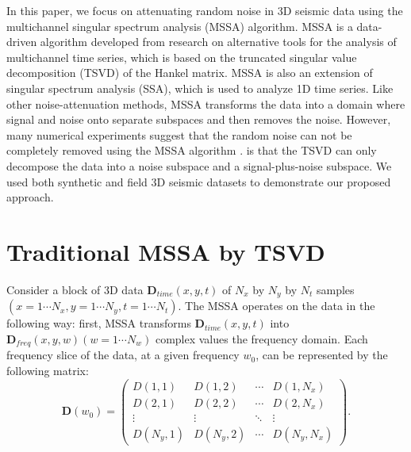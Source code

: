 In this paper, we focus on attenuating random noise in 3D seismic data using the multichannel singular spectrum analysis (MSSA) algorithm. MSSA is a data-driven algorithm developed from research on alternative tools for the analysis of multichannel time series, which is based on the truncated singular value decomposition (TSVD) \cite[]{golub1996} of the Hankel matrix. MSSA is also an extension of singular spectrum analysis (SSA), which is used to analyze 1D time series. Like other noise-attenuation methods, MSSA transforms the data into a domain where signal and noise   onto separate subspaces and then removes the noise. However, many numerical experiments suggest that the random noise can not be completely removed using the MSSA algorithm \cite[]{weilin2015}.  is that the TSVD can only decompose the data into a noise subspace and a signal-plus-noise subspace.  We used both synthetic and field 3D seismic datasets to demonstrate our proposed approach.


\section{Traditional MSSA by TSVD}
Consider a block of 3D data $\mathbf{D}_{time}(x,y,t)$ of $N_x$ by $N_y$ by $N_t$ samples $(x=1\cdots N_x,y=1\cdots N_y,t=1\cdots N_t)$. The MSSA \cite[]{mssa} operates on the data in the following way: first, MSSA transforms $\mathbf{D}_{time}(x,y,t)$ into $\mathbf{D}_{freq}(x,y,w)(w=1\cdots N_w)$  complex values  the frequency domain. Each frequency slice of the data, at a given frequency $w_0$, can be represented by the following matrix:
\begin{equation}
\label{eq:mssa}
\mathbf{D}(w_0)=\left(\begin{array}{cccc}
D(1,1) & D(1,2) & \cdots &D(1,N_x) \\
D(2,1) & D(2,2)  &\cdots &D(2,N_x) \\
\vdots & \vdots &\ddots &\vdots \\
D(N_y,1)&D(N_y,2) &\cdots&D(N_y,N_x)
\end{array}
\right).
\end{equation}

